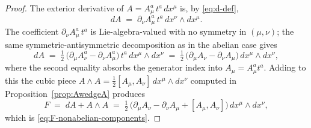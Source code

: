 \begin{proof}
The exterior derivative of $A = A_\mu^a\, t^a\, dx^\mu$ is, by \eqref{eq:d-def},
\begin{equation*}
dA \;=\; \partial_\nu A_\mu^a\, t^a\, dx^\nu \wedge dx^\mu.
\end{equation*}
The coefficient $\partial_\nu A_\mu^a\, t^a$ is Lie-algebra-valued with no symmetry in $(\mu, \nu)$; the same symmetric-antisymmetric decomposition as in the abelian case gives
\begin{equation*}
dA \;=\; \tfrac{1}{2}\,\bigl(\partial_\mu A_\nu^a - \partial_\nu A_\mu^a\bigr)\, t^a\, dx^\mu \wedge dx^\nu \;=\; \tfrac{1}{2}\,\bigl(\partial_\mu A_\nu - \partial_\nu A_\mu\bigr)\, dx^\mu \wedge dx^\nu,
\end{equation*}
where the second equality absorbs the generator index into $A_\mu = A_\mu^a t^a$. Adding to this the cubic piece $A\wedge A = \tfrac{1}{2}[A_\mu, A_\nu]\, dx^\mu \wedge dx^\nu$ computed in Proposition~\ref{prop:AwedgeA} produces
\begin{equation*}
F \;=\; dA + A\wedge A \;=\; \tfrac{1}{2}\,\bigl(\partial_\mu A_\nu - \partial_\nu A_\mu + [A_\mu, A_\nu]\bigr)\, dx^\mu \wedge dx^\nu,
\end{equation*}
which is \eqref{eq:F-nonabelian-components}.
\end{proof}

